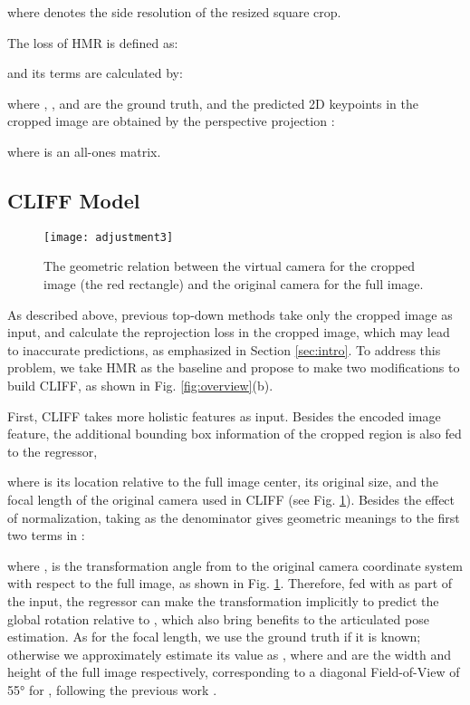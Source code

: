 \documentclass[runningheads]{llncs}
\begin{document}
where  denotes the side resolution of the resized square crop.

The loss of HMR is defined as:

and its terms are calculated by:

where , , and  are the ground truth, and the predicted 2D keypoints in the cropped image are obtained by the perspective projection :

where  is an all-ones matrix.

\subsection{CLIFF Model}

\begin{figure}[t]
	\centering
	\texttt{[image: adjustment3]}
	\caption {The geometric relation between the virtual camera  for the cropped image (the red rectangle) and the original camera  for the full image.}
	\label{fig:adjust}
\end{figure}

As described above, previous top-down methods take only the cropped image as input, and calculate the reprojection loss in the cropped image, which may lead to inaccurate predictions, as emphasized in Section \ref{sec:intro}.
To address this problem, we take HMR as the baseline and propose to make two modifications to build CLIFF, as shown in Fig. \ref{fig:overview}(b).

First, CLIFF takes more holistic features as input.
Besides the encoded image feature, the additional bounding box information  of the cropped region is also fed to the regressor,

where  is its location relative to the full image center,  its original size, and  the focal length of the original camera  used in CLIFF (see Fig. \ref{fig:adjust}).
Besides the effect of normalization, taking  as the denominator gives geometric meanings to the first two terms in :

where ,  is the transformation angle from  to the original camera  coordinate system with respect to the full image, as shown in Fig. \ref{fig:adjust}.
Therefore, fed with  as part of the input, the regressor can make the transformation implicitly to predict the global rotation relative to , which also bring benefits to the articulated pose estimation.
As for the focal length, we use the ground truth if it is known; otherwise we approximately estimate its value as , where  and  are the width and height of the full image respectively, corresponding to a diagonal Field-of-View of 55° for , following the previous work \cite{kissos2020beyond}.
\end{document}
